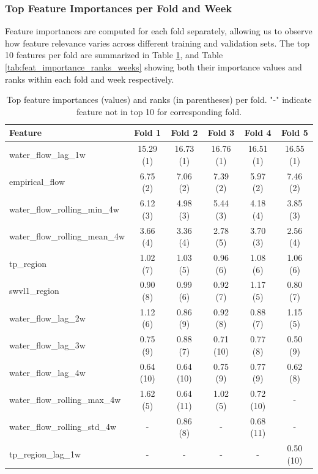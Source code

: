 \documentclass[ruler]{CUP-JNL-EDS}%
\begin{document}
\subsubsection*{Top Feature Importances per Fold and Week}
Feature importances are computed for each fold separately, allowing us to observe how feature relevance varies 
across different training and validation sets. The top 10 features per fold are summarized in Table 
\ref{tab:feat_importance_ranks_folds}, and Table \ref{tab:feat_importance_ranks_weeks} showing both their 
importance values and ranks within each fold and week respectively.
\begin{table}[!htp]
\centering
\small
\begin{tabular}{lccccc}
\hline
\textbf{Feature} & \textbf{Fold 1} & \textbf{Fold 2} & \textbf{Fold 3} & \textbf{Fold 4} & \textbf{Fold 5} \\
\hline
water\_flow\_lag\_1w           & 15.29 (1) & 16.73 (1) & 16.76 (1) & 16.51 (1) & 16.55 (1) \\
empirical\_flow               & 6.75 (2)  & 7.06 (2)  & 7.39 (2)  & 5.97 (2)  & 7.46 (2) \\
water\_flow\_rolling\_min\_4w & 6.12 (3)  & 4.98 (3)  & 5.44 (3)  & 4.18 (4)  & 3.85 (3) \\
water\_flow\_rolling\_mean\_4w & 3.66 (4)  & 3.36 (4)  & 2.78 (5)  & 3.70 (3)  & 2.56 (4) \\
tp\_region                   & 1.02 (7)  & 1.03 (5)  & 0.96 (6)  & 1.08 (6)  & 1.06 (6) \\
swvl1\_region                & 0.90 (8)  & 0.99 (6)  & 0.92 (7)  & 1.17 (5)  & 0.80 (7) \\
water\_flow\_lag\_2w           & 1.12 (6)  & 0.86 (9)  & 0.92 (8)  & 0.88 (7)  & 1.15 (5) \\
water\_flow\_lag\_3w           & 0.75 (9)  & 0.88 (7)  & 0.71 (10) & 0.77 (8)  & 0.50 (9) \\
water\_flow\_lag\_4w           & 0.64 (10) & 0.64 (10) & 0.75 (9)  & 0.77 (9)  & 0.62 (8) \\
water\_flow\_rolling\_max\_4w & 1.62 (5)  & 0.64 (11) & 1.02 (5)  & 0.72 (10) & -         \\
water\_flow\_rolling\_std\_4w & -         & 0.86 (8)  & -         & 0.68 (11) & -         \\
tp\_region\_lag\_1w           & -         & -         & -         & -         & 0.50 (10) \\
\hline
\end{tabular}
\caption{Top feature importances (values) and ranks (in parentheses) per fold. "-" indicate feature not in top 10 for corresponding fold.}
\label{tab:feat_importance_ranks_folds}
\end{table}
\end{document}
